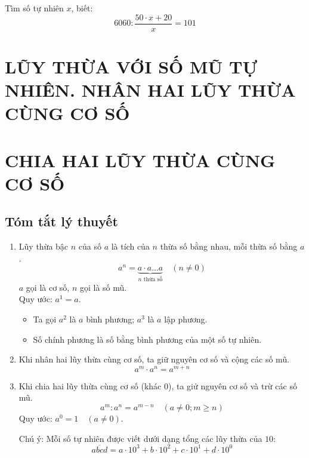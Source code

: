 \begin{bt}%
	Tìm số tự nhiên $x$, biết: $$ 6060 : \dfrac{50\cdot x + 20}{x} = 101$$
\end{bt}






\section{LŨY THỪA VỚI SỐ MŨ TỰ NHIÊN. NHÂN HAI LŨY THỪA CÙNG CƠ SỐ}





\section{CHIA HAI LŨY THỪA CÙNG CƠ SỐ}
\subsection{Tóm tắt lý thuyết}
\begin{enumerate}
	\item Lũy thừa bậc $n$ của số $a$ là tích của $n$ thừa số bằng nhau, mỗi thừa số bằng $a$.
	$$a^n = \underbrace{a\cdot a\ldots a}_{n \mbox{ thừa số}} \quad \left( n \neq 0\right) $$
	$a$ gọi là cơ số, $n$ gọi là số mũ.\\
	Quy ước: $a^1 = a$.
	\begin{itemize}
		\item Ta gọi $a^2$ là $a$ bình phương; $a^3$ là $a$ lập phương.
		\item Số chính phương là số bằng bình phương của một số tự nhiên.
	\end{itemize}
	\item Khi nhân hai lũy thừa cùng cơ số, ta giữ nguyên cơ số và cộng các số mũ.
	$$a^m\cdot a^n = a^{m+n}$$
	\item Khi chia hai lũy thừa cùng cơ số (khác $0$), ta giử nguyên cơ số và trừ các số mũ.
	$$a^m : a^n = a^{m-n} \quad \left( a\neq 0; m \geq n\right) $$
	Quy ước: $a^0 = 1 \quad \left( a \neq 0\right) $.
	\begin{note}
		Chú ý: Mỗi số tự nhiên được viết dưới dạng tổng các lũy thừa của $10$:
		$$ \overline{abcd} = a\cdot 10^3 + b\cdot 10^2 + c\cdot 10^1 + d\cdot 10^0$$
	\end{note}
\end{enumerate}
